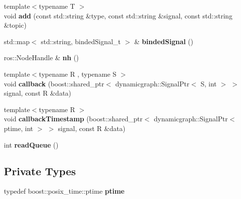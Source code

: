 \begin{DoxyCompactItemize}
\mbox{\label{classdynamic__graph_1_1RosQueuedSubscribe_ad676b92e3c68923c36e0794df9a36b07}} 
{\footnotesize template$<$typename T $>$ }\\void {\bfseries add} (const std\+::string \&type, const std\+::string \&signal, const std\+::string \&topic)
\item 
\mbox{\label{classdynamic__graph_1_1RosQueuedSubscribe_ab6a37292689cb3798d9348561a2b6796}} 
std\+::map$<$ std\+::string, binded\+Signal\+\_\+t $>$ \& {\bfseries binded\+Signal} ()
\item 
\mbox{\label{classdynamic__graph_1_1RosQueuedSubscribe_a2e5ddc40978683c8c5ee5e1a6758aa22}} 
ros\+::\+Node\+Handle \& {\bfseries nh} ()
\item 
\mbox{\label{classdynamic__graph_1_1RosQueuedSubscribe_afe57f995f66aa7bbf5d006e876cdbd66}} 
{\footnotesize template$<$typename R , typename S $>$ }\\void {\bfseries callback} (boost\+::shared\+\_\+ptr$<$ dynamicgraph\+::\+Signal\+Ptr$<$ S, int $>$ $>$ signal, const R \&data)
\item 
\mbox{\label{classdynamic__graph_1_1RosQueuedSubscribe_acfb7c66275aa4680cf0c6b40edeabb9d}} 
{\footnotesize template$<$typename R $>$ }\\void {\bfseries callback\+Timestamp} (boost\+::shared\+\_\+ptr$<$ dynamicgraph\+::\+Signal\+Ptr$<$ ptime, int $>$ $>$ signal, const R \&data)
\item 
\mbox{\label{classdynamic__graph_1_1RosQueuedSubscribe_a274d716f1f8fdba71963dd04db0fefd4}} 
int {\bfseries read\+Queue} ()
\end{DoxyCompactItemize}
\subsection*{Private Types}
\begin{DoxyCompactItemize}
\item 
\mbox{\label{classdynamic__graph_1_1RosQueuedSubscribe_a78091d9cf016f41283ca5a793b9cd486}} 
typedef boost\+::posix\+\_\+time\+::ptime {\bfseries ptime}
\end{DoxyCompactItemize}
